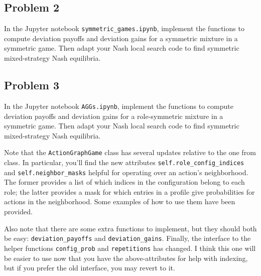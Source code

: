\documentclass[11pt]{article}
\begin{document}
\subsection*{Problem 2}

In the Jupyter notebook \texttt{symmetric\_games.ipynb}, implement the functions to compute deviation payoffs and deviation gains for a symmetric mixture in a symmetric game.
Then adapt your Nash local search code to find symmetric mixed-strategy Nash equilibria.



\subsection*{Problem 3}

In the Jupyter notebook \texttt{AGGs.ipynb}, implement the functions to compute deviation payoffs and deviation gains for a role-symmetric mixture in a symmetric game.
Then adapt your Nash local search code to find symmetric mixed-strategy Nash equilibria.

Note that the \texttt{ActionGraphGame} class has several updates relative to the one from class.
In particular, you'll find the new attributes \texttt{self.role\_config\_indices} and \texttt{self.neighbor\_masks} helpful for operating over an action's neighborhood.
The former provides a list of which indices in the configuration belong to each role;
the latter provides a mask for which entries in a profile give probabilities for actions in the neighborhood.
Some examples of how to use them have been provided.

Also note that there are some extra functions to implement, but they should both be easy: \texttt{deviation\_payoffs} and \texttt{deviation\_gains}.
Finally, the interface to the helper functions \texttt{config\_prob} and \texttt{repetitions} has changed.
I think this one will be easier to use now that you have the above-attributes for help with indexing, but if you prefer the old interface, you may revert to it.
\end{document}
